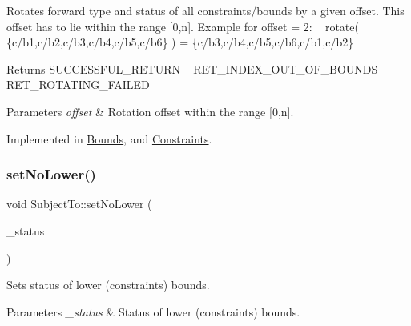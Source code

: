 Rotates forward type and status of all constraints/bounds by a given offset. This offset has to lie within the range \mbox{[}0,n\mbox{]}. Example for offset = 2\+: ~\newline
rotate( \{c/b1,c/b2,c/b3,c/b4,c/b5,c/b6\} ) = \{c/b3,c/b4,c/b5,c/b6,c/b1,c/b2\} \begin{DoxyReturn}{Returns}
S\+U\+C\+C\+E\+S\+S\+F\+U\+L\+\_\+\+R\+E\+T\+U\+RN ~\newline
 R\+E\+T\+\_\+\+I\+N\+D\+E\+X\+\_\+\+O\+U\+T\+\_\+\+O\+F\+\_\+\+B\+O\+U\+N\+DS ~\newline
 R\+E\+T\+\_\+\+R\+O\+T\+A\+T\+I\+N\+G\+\_\+\+F\+A\+I\+L\+ED 
\end{DoxyReturn}

\begin{DoxyParams}{Parameters}
{\em offset} & Rotation offset within the range \mbox{[}0,n\mbox{]}. \\
\hline
\end{DoxyParams}


Implemented in \hyperlink{class_bounds_abe45f347747df4a323d1d55bc21a5914}{Bounds}, and \hyperlink{class_constraints_a13958ee91f93760c0cb9d5a47de846f2}{Constraints}.

\mbox{\label{class_subject_to_a5c83994df77ef2ef2b8f2bace9ff8a83}} 
\subsubsection{\texorpdfstring{set\+No\+Lower()}{setNoLower()}}
{\footnotesize\ttfamily void Subject\+To\+::set\+No\+Lower (\begin{DoxyParamCaption}\item[{\hyperlink{_types_8hpp_a20f82124c82b6f5686a7fce454ef9089}{Boolean\+Type}}]{\+\_\+status }\end{DoxyParamCaption})\hspace{0.3cm}{\ttfamily [inline]}}

Sets status of lower (constraints\textquotesingle{}) bounds. 
\begin{DoxyParams}{Parameters}
{\em \+\_\+status} & Status of lower (constraints\textquotesingle{}) bounds. \\
\hline
\end{DoxyParams}
\mbox{\label{class_subject_to_a3cb48f0d24fc5cdd11697465c5b46f13}} 
